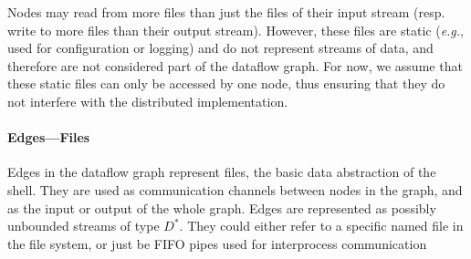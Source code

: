 \documentclass[acmsmall,10pt,review,anonymous]{acmart}
\newcommand{\eg}{{\em e.g.}, }
\newcommand{\TODO}[1]{\hl{\textbf{TODO:} #1}\xspace}
\newcommand{\kstar}{^{\textstyle *}}
\begin{document}

Nodes may read from more files than just the files of their
input stream (resp. write to more files than their output stream).
However, these files are static (\eg used for configuration or
logging) and do not represent streams of data, and therefore are not
considered part of the dataflow graph.
For now, we assume that these static
files can only be accessed by one node, thus ensuring that they do not
interfere with the distributed implementation.

\paragraph{Edges---Files}

Edges in the dataflow graph represent files, the basic data
abstraction of the shell. They are used as communication channels
between nodes in the graph, and as the input or output of the whole
graph. Edges are represented as possibly unbounded streams of type
$D\kstar$. They could either refer to a specific named file in the file
system, or just be FIFO pipes used for interprocess communication


\end{document}
